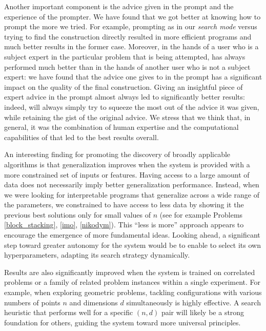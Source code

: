 Another important component is the advice given in the prompt and the experience of the prompter. We have found that we got better at knowing how to prompt \AlphaEvolve the more we tried. For example, prompting as in our \textit{search mode} versus trying to find the construction directly resulted in more efficient programs and much better results in the former case. Moreover, in the hands of a user who is a subject expert in the particular problem that is being attempted, \AlphaEvolve has always performed much better than in the hands of another user who is not a subject expert: we have found that the advice one gives to \AlphaEvolve in the prompt has a significant impact on the quality of the final construction. Giving \AlphaEvolve an insightful piece of expert advice in the prompt almost always led to significantly better results: indeed, \AlphaEvolve will always simply try to squeeze the most out of the advice it was given, while retaining the gist of the original advice.
We stress that we think that, in general, it was the combination of human expertise and the computational capabilities of \AlphaEvolve that led to the best results overall.


An interesting finding for promoting the discovery of broadly applicable algorithms is that generalization improves when the system is provided with a more constrained set of inputs or features. Having access to a large amount of data does not necessarily imply better generalization performance. Instead, when we were looking for interpretable programs that generalize across a wide range of the parameters, we constrained \AlphaEvolve to have access to less data by showing it the previous best solutions only for small values of $n$  (see for example Problems \ref{block_stacking}, \ref{imo}, \ref{nikodym}). This ``less is more'' approach appears to  encourage the emergence of more fundamental ideas. Looking ahead, a significant step toward greater autonomy for the system would be to enable \AlphaEvolve to select its own hyperparameters, adapting its search strategy dynamically. 

Results are also significantly improved when the system is trained on correlated problems or a family of related problem instances within a single experiment. For example, when exploring geometric problems, tackling configurations with various numbers of points $n$ and dimensions $d$ simultaneously is highly effective. A search heuristic that performs well for a specific $(n,d)$ pair will likely be a strong foundation for others, guiding the system toward more universal principles. 


